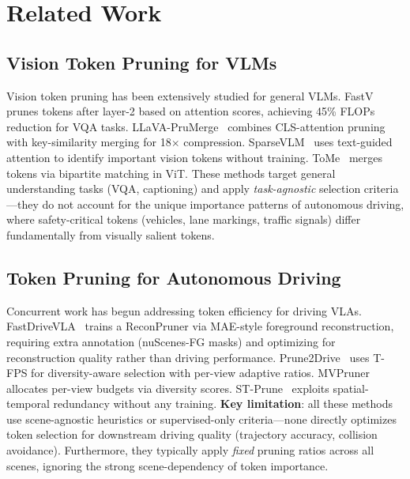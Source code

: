 \documentclass[letterpaper]{article} %
\begin{document}
\section{Related Work}
\label{sec:related}

\subsection{Vision Token Pruning for VLMs}

Vision token pruning has been extensively studied for general VLMs.
FastV~\citep{fastv2024} prunes tokens after layer-2 based on attention scores, achieving 45\% FLOPs reduction for VQA tasks.
LLaVA-PruMerge~\citep{llava_prumerge2024} combines CLS-attention pruning with key-similarity merging for 18$\times$ compression.
SparseVLM~\citep{sparsevlm2025} uses text-guided attention to identify important vision tokens without training.
ToMe~\citep{tome2023} merges tokens via bipartite matching in ViT.
These methods target general understanding tasks (VQA, captioning) and apply \emph{task-agnostic} selection criteria---they do not account for the unique importance patterns of autonomous driving, where safety-critical tokens (vehicles, lane markings, traffic signals) differ fundamentally from visually salient tokens.

\subsection{Token Pruning for Autonomous Driving}

Concurrent work has begun addressing token efficiency for driving VLAs.
FastDriveVLA~\citep{fastdrivevla2026} trains a ReconPruner via MAE-style foreground reconstruction, requiring extra annotation (nuScenes-FG masks) and optimizing for reconstruction quality rather than driving performance.
Prune2Drive~\citep{prune2drive2026} uses T-FPS for diversity-aware selection with per-view adaptive ratios.
MVPruner~\citep{mvpruner2026} allocates per-view budgets via diversity scores.
ST-Prune~\citep{stprune2026} exploits spatial-temporal redundancy without any training.
\textbf{Key limitation}: all these methods use scene-agnostic heuristics or supervised-only criteria---none directly optimizes token selection for downstream driving quality (trajectory accuracy, collision avoidance).
Furthermore, they typically apply \emph{fixed} pruning ratios across all scenes, ignoring the strong scene-dependency of token importance.
\end{document}
